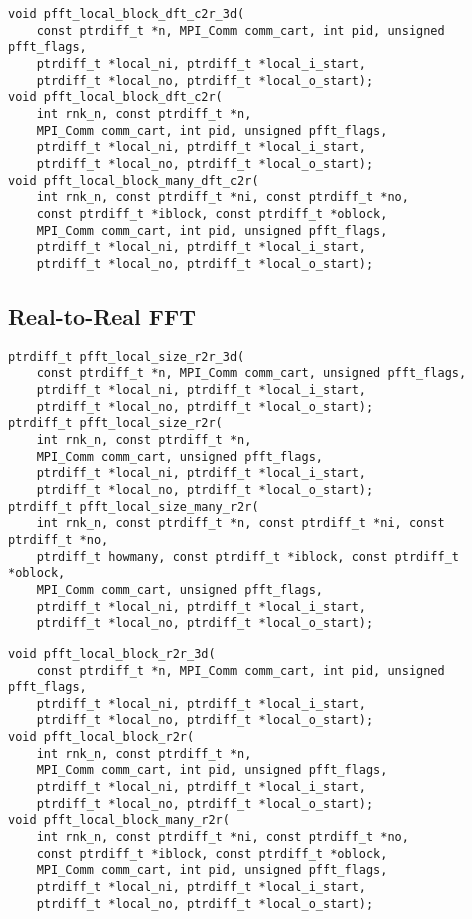 \begin{lstlisting}
void pfft_local_block_dft_c2r_3d(
    const ptrdiff_t *n, MPI_Comm comm_cart, int pid, unsigned pfft_flags,
    ptrdiff_t *local_ni, ptrdiff_t *local_i_start,
    ptrdiff_t *local_no, ptrdiff_t *local_o_start);
void pfft_local_block_dft_c2r(
    int rnk_n, const ptrdiff_t *n,
    MPI_Comm comm_cart, int pid, unsigned pfft_flags,
    ptrdiff_t *local_ni, ptrdiff_t *local_i_start,
    ptrdiff_t *local_no, ptrdiff_t *local_o_start);
void pfft_local_block_many_dft_c2r(
    int rnk_n, const ptrdiff_t *ni, const ptrdiff_t *no,
    const ptrdiff_t *iblock, const ptrdiff_t *oblock,
    MPI_Comm comm_cart, int pid, unsigned pfft_flags,
    ptrdiff_t *local_ni, ptrdiff_t *local_i_start,
    ptrdiff_t *local_no, ptrdiff_t *local_o_start);
\end{lstlisting}

\subsection{Real-to-Real FFT}
\begin{lstlisting}
ptrdiff_t pfft_local_size_r2r_3d(
    const ptrdiff_t *n, MPI_Comm comm_cart, unsigned pfft_flags,
    ptrdiff_t *local_ni, ptrdiff_t *local_i_start,
    ptrdiff_t *local_no, ptrdiff_t *local_o_start);
ptrdiff_t pfft_local_size_r2r(
    int rnk_n, const ptrdiff_t *n,
    MPI_Comm comm_cart, unsigned pfft_flags,
    ptrdiff_t *local_ni, ptrdiff_t *local_i_start,
    ptrdiff_t *local_no, ptrdiff_t *local_o_start);
ptrdiff_t pfft_local_size_many_r2r(
    int rnk_n, const ptrdiff_t *n, const ptrdiff_t *ni, const ptrdiff_t *no,
    ptrdiff_t howmany, const ptrdiff_t *iblock, const ptrdiff_t *oblock,
    MPI_Comm comm_cart, unsigned pfft_flags,
    ptrdiff_t *local_ni, ptrdiff_t *local_i_start,
    ptrdiff_t *local_no, ptrdiff_t *local_o_start);
\end{lstlisting}

\begin{lstlisting}
void pfft_local_block_r2r_3d(
    const ptrdiff_t *n, MPI_Comm comm_cart, int pid, unsigned pfft_flags,
    ptrdiff_t *local_ni, ptrdiff_t *local_i_start,
    ptrdiff_t *local_no, ptrdiff_t *local_o_start);
void pfft_local_block_r2r(
    int rnk_n, const ptrdiff_t *n,
    MPI_Comm comm_cart, int pid, unsigned pfft_flags,
    ptrdiff_t *local_ni, ptrdiff_t *local_i_start,
    ptrdiff_t *local_no, ptrdiff_t *local_o_start);
void pfft_local_block_many_r2r(
    int rnk_n, const ptrdiff_t *ni, const ptrdiff_t *no,
    const ptrdiff_t *iblock, const ptrdiff_t *oblock,
    MPI_Comm comm_cart, int pid, unsigned pfft_flags,
    ptrdiff_t *local_ni, ptrdiff_t *local_i_start,
    ptrdiff_t *local_no, ptrdiff_t *local_o_start);
\end{lstlisting}


